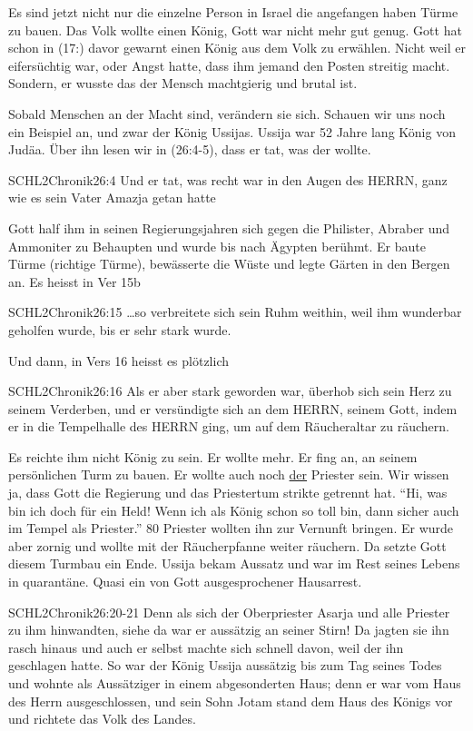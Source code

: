 \documentclass[12pt]{../../inc/mybib}
\newenvironment{block}[1][]{%
  \vspace{1.5em}%
  \noindent\textbf{#1}\par%
  \vspace{0.0em}%
}{%
  \vspace{1em}%
}
\begin{document}
\begin{block}

    Es sind jetzt nicht nur die einzelne Person in Israel die angefangen haben Türme zu bauen. Das Volk wollte einen König, Gott war nicht mehr gut genug. Gott hat schon in (17:) davor gewarnt einen König aus dem Volk zu erwählen. Nicht weil er eifersüchtig war, oder Angst hatte, dass ihm jemand den Posten streitig macht. Sondern, er wusste das der Mensch machtgierig und brutal ist.
    
    Sobald Menschen an der Macht sind, verändern sie sich. Schauen wir uns noch ein Beispiel an, und zwar der König Ussijas. Ussija war 52 Jahre lang König von Judäa. Über ihn lesen wir in (26:4-5), dass er tat, was der \herr{} wollte. 
    \begin{bibelbox}{SCHL}{2Chronik}{26:4}
        Und er tat, was recht war in den Augen des HERRN, ganz wie es sein Vater Amazja getan hatte
    \end{bibelbox} 
    Gott half ihm in seinen Regierungsjahren sich gegen die Philister, Abraber und Ammoniter zu Behaupten und wurde bis nach Ägypten berühmt. Er baute Türme (richtige Türme), bewässerte die Wüste und legte Gärten in den Bergen an. Es heisst in Ver 15b
    \begin{bibelbox}{SCHL}{2Chronik}{26:15}
        \dots so verbreitete sich sein Ruhm weithin, weil ihm wunderbar geholfen wurde, bis er sehr stark wurde.
    \end{bibelbox} 

    Und dann, in Vers 16 heisst es plötzlich
    \begin{bibelbox}{SCHL}{2Chronik}{26:16}
        Als er aber stark geworden war, überhob sich sein Herz zu seinem Verderben, und er versündigte sich an dem HERRN, seinem Gott, indem er in die Tempelhalle des HERRN ging, um auf dem Räucheraltar zu räuchern.
    \end{bibelbox} 
    Es reichte ihm nicht König zu sein. Er wollte mehr. Er fing an, an seinem persönlichen Turm zu bauen. Er wollte auch noch \underline{der} Priester sein. Wir wissen ja, dass Gott die Regierung und das Priestertum strikte getrennt hat. 
    \enquote{Hi, was bin ich doch für ein Held! Wenn ich als König schon so toll bin, dann sicher auch im Tempel als Priester.} 80 Priester wollten ihn zur Vernunft bringen. Er wurde aber zornig und wollte mit der Räucherpfanne weiter räuchern. Da setzte Gott diesem Turmbau ein Ende. Ussija bekam Aussatz und war im Rest seines Lebens in quarantäne. Quasi ein von Gott ausgesprochener Hausarrest.
    \begin{bibelbox}{SCHL}{2Chronik}{26:20-21}
        Denn als sich der Oberpriester Asarja und alle Priester zu ihm hinwandten, siehe da war er aussätzig an seiner Stirn! Da jagten sie ihn rasch hinaus und auch er selbst machte sich schnell davon, weil der \herr{} ihn geschlagen hatte.
        So war der König Ussija aussätzig bis zum Tag seines Todes und wohnte als Aussätziger in einem abgesonderten Haus; denn er war vom Haus des Herrn ausgeschlossen, und sein Sohn Jotam stand dem Haus des Königs vor und richtete das Volk des Landes.
    \end{bibelbox}
\end{block}
\end{document}
